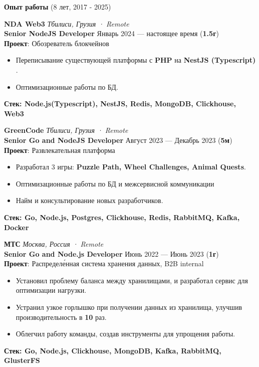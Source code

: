 \documentclass{resume}
\begin{document}
\begin{rSection}
    {\textbf{Опыт работы} (8 лет, 2017 - 2025) }

    \textbf{NDA Web3} \hfill \textit{Тбилиси, Грузия · Remote} \\
    \textbf{Senior NodeJS Developer}  \hfill Январь 2024 --- настоящее время ({\textbf{1.5г}}) \\
    \textbf{Проект}: Обозреватель блокчейнов
    \begin{itemize}
        \item Переписывание существующей платформы с \textbf{PHP} на \textbf{NestJS (Typescript)} \@.
        \item Оптимизационные работы по БД.
    \end{itemize}
    \textbf{Стек: Node.js(Typescript), NestJS, Redis, MongoDB, Clickhouse, Web3}

    \textbf{GreenCode} \hfill \textit{Тбилиси, Грузия · Remote} \\
    \textbf{Senior Go and NodeJS Developer}  \hfill Август 2023 --- Декабрь 2023 ({\textbf{5м}}) \\
    \textbf{Проект}: Развлекательная платформа
    \begin{itemize}
        \item Разработал 3 игры: \textbf{Puzzle Path, Wheel Challenges, Animal Quests}\@.
        \item Оптимизационные работы по БД и межсервисной коммуникации
        \item Найм и консультирование новых разработчиков\@.
    \end{itemize}
    \textbf{Стек: Go, Node.js, Postgres, Clickhouse, Redis, RabbitMQ, Kafka, Docker}

    \clearpage
    \textbf{МТС} \hfill \textit{Москва, Россия · Remote} \\
    \textbf{Senior Go and Node.js Developer}  \hfill Июнь 2022 --- Июнь 2023 ({\textbf{1г}}) \\
    \textbf{Проект}: Распределе́нная система хранения данных, B2B internal
    \begin{itemize}
        \item Установил проблему баланса между хранилищами, и разработал сервис для оптимизации нагрузки.
        \item Устранил узкое горлышко при получении данных из хранилища, улучшив производительность в \textbf{10} раз\@.
        \item Облегчил работу команды, создав инструменты для упрощения работы\@.
    \end{itemize}
    \textbf{Стек: Go, Node.js, Clickhouse, MongoDB, Kafka, RabbitMQ, GlusterFS}


\end{rSection}
\end{document}
